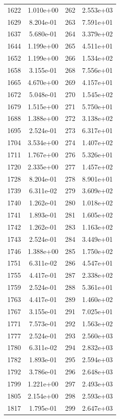 \documentclass[12pt]{article}
\begin{document}
\begin{longtable}{@{}cccc@{}}
1622 & 1.010e+00 & 262 & 2.553e+03 \\
1629 & 8.204e-01 & 263 & 7.591e+01 \\
1637 & 5.680e-01 & 264 & 3.379e+02 \\
1644 & 1.199e+00 & 265 & 4.511e+01 \\
1652 & 1.199e+00 & 266 & 1.534e+02 \\
1658 & 3.155e-01 & 268 & 7.556e+01 \\
1665 & 4.670e+00 & 269 & 4.157e+01 \\
1672 & 5.048e-01 & 270 & 1.545e+02 \\
1679 & 1.515e+00 & 271 & 5.750e+01 \\
1688 & 1.388e+00 & 272 & 3.138e+02 \\
1695 & 2.524e-01 & 273 & 6.317e+01 \\
1704 & 3.534e+00 & 274 & 1.407e+02 \\
1711 & 1.767e+00 & 276 & 5.326e+01 \\
1720 & 2.335e+00 & 277 & 1.457e+02 \\
1728 & 8.204e-01 & 278 & 8.901e+01 \\
1739 & 6.311e-02 & 279 & 3.609e+02 \\
1740 & 1.262e-01 & 280 & 1.018e+02 \\
1741 & 1.893e-01 & 281 & 1.605e+02 \\
1742 & 1.262e-01 & 283 & 1.163e+02 \\
1743 & 2.524e-01 & 284 & 3.449e+01 \\
1746 & 1.388e+00 & 285 & 1.750e+02 \\
1751 & 6.311e-02 & 286 & 4.547e+01 \\
1755 & 4.417e-01 & 287 & 2.338e+02 \\
1759 & 2.524e-01 & 288 & 5.361e+01 \\
1763 & 4.417e-01 & 289 & 1.460e+02 \\
1767 & 3.155e-01 & 291 & 7.025e+01 \\
1771 & 7.573e-01 & 292 & 1.563e+02 \\
1777 & 2.524e-01 & 293 & 2.560e+03 \\
1780 & 6.311e-02 & 294 & 2.832e+03 \\
1782 & 1.893e-01 & 295 & 2.594e+03 \\
1792 & 3.786e-01 & 296 & 2.648e+03 \\
1799 & 1.221e+00 & 297 & 2.493e+03 \\
1805 & 2.154e+00 & 298 & 2.593e+03 \\
1817 & 1.795e-01 & 299 & 2.647e+03 \\

\end{longtable}
\end{document}
